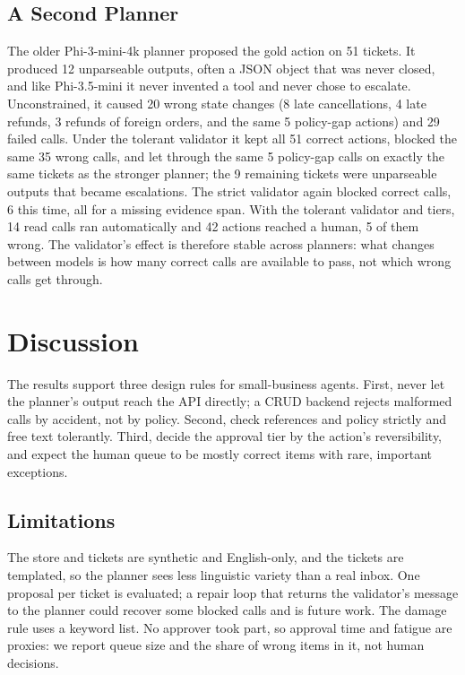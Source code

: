 \documentclass{icaiit2027}
\begin{document}
\subsection{A Second Planner}

The older Phi-3-mini-4k planner proposed the gold action on 51 tickets. It produced 12 unparseable outputs, often a JSON object that was never closed, and like Phi-3.5-mini it never invented a tool and never chose to escalate. Unconstrained, it caused 20 wrong state changes (8 late cancellations, 4 late refunds, 3 refunds of foreign orders, and the same 5 policy-gap actions) and 29 failed calls. Under the tolerant validator it kept all 51 correct actions, blocked the same 35 wrong calls, and let through the same 5 policy-gap calls on exactly the same tickets as the stronger planner; the 9 remaining tickets were unparseable outputs that became escalations. The strict validator again blocked correct calls, 6 this time, all for a missing evidence span. With the tolerant validator and tiers, 14 read calls ran automatically and 42 actions reached a human, 5 of them wrong. The validator's effect is therefore stable across planners: what changes between models is how many correct calls are available to pass, not which wrong calls get through.

\section{Discussion}

The results support three design rules for small-business agents. First, never let the planner's output reach the API directly; a CRUD backend rejects malformed calls by accident, not by policy. Second, check references and policy strictly and free text tolerantly. Third, decide the approval tier by the action's reversibility, and expect the human queue to be mostly correct items with rare, important exceptions.

\subsection{Limitations}

The store and tickets are synthetic and English-only, and the tickets are templated, so the planner sees less linguistic variety than a real inbox. One proposal per ticket is evaluated; a repair loop that returns the validator's message to the planner could recover some blocked calls and is future work. The damage rule uses a keyword list. No approver took part, so approval time and fatigue are proxies: we report queue size and the share of wrong items in it, not human decisions.
\end{document}

